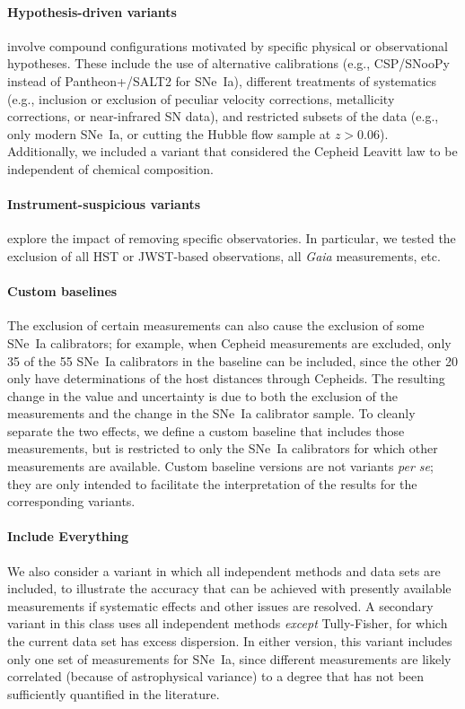 \paragraph{Hypothesis-driven variants} involve compound 
configurations motivated by specific physical or observational hypotheses. These include the use of alternative calibrations (e.g., CSP/SNooPy instead of Pantheon+/SALT2 for SNe~Ia), different treatments of systematics (e.g., inclusion or exclusion of peculiar velocity corrections, metallicity corrections, or near-infrared SN data), and restricted subsets of the data (e.g., only modern SNe~Ia, or cutting the Hubble flow sample at $z > 0.06$). Additionally, we included a variant that considered the Cepheid Leavitt law to be independent of chemical composition.

\paragraph{Instrument-suspicious variants} explore the impact of removing specific observatories. In particular, we tested the exclusion of all HST or JWST-based observations, all {\it Gaia} measurements, etc.

\paragraph{Custom baselines} The exclusion of certain measurements can also cause the exclusion of some SNe~Ia calibrators; for example, when Cepheid measurements are excluded, only 35 of the 55 SNe~Ia calibrators in the baseline can be included, since the other 20 only have determinations of the host distances through Cepheids. The resulting change in the {\Hcst} value and uncertainty is due to both the exclusion of the measurements and the change in the SNe~Ia calibrator sample. To cleanly separate the two effects, we define a custom baseline that includes those measurements, but is restricted to only the SNe~Ia calibrators for which other measurements are available. Custom baseline versions are not variants {\it per se}; they are only intended to facilitate the interpretation of the results for the corresponding variants.  

\paragraph {Include Everything}
We also consider a variant in which all independent methods and data sets are included, to illustrate the accuracy that can be achieved with presently available measurements if systematic effects and other issues are resolved.  A secondary variant in this class uses all independent methods \textit{except} Tully-Fisher, for which the current data set has excess dispersion.  In either version, this variant includes only one set of measurements for SNe~Ia, since different measurements are likely correlated (because of astrophysical variance) to a degree that has not been sufficiently quantified in the literature.  

